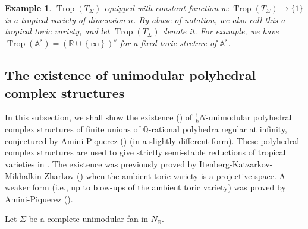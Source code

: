 \documentclass[12pt,a4]{amsart}
\newtheorem{exam}[thm]{Example}
\def\A{\mathbb{A}}
\def\R{\mathbb{R}}
\def\Q{\mathbb{Q}}
\def\Trop{\mathop{\mathrm{trop}}\nolimits}
\def\Trop{\mathop{\mathrm{Trop}}\nolimits}
\numberwithin{equation}{section}
\numberwithin{figure}{section}
\begin{document}
  
  \begin{exam}
  $\Trop (T_\Sigma)$ equipped with constant function $w \colon \Trop (T_\Sigma) \to \{ 1 \}$
  is a tropical variety of dimension $n$. 
  By abuse of notation, we also call this a \emph{tropical toric variety,}
  and let $\Trop(T_{\Sigma})$ denote it. 
  For example, we have $\Trop(\A^{s})=(\R\cup\left\{ \infty\right\} )^{s}$
  for a fixed toric strcture of $\A^{s}$. 
  \end{exam}




 \subsection{The existence of unimodular polyhedral complex structures}
  \label{subsec:the_existence_of_unimodular_triangulations}

  In this subsection, 
    we shall show the existence () of 
    $\frac{1}{k}N$-unimodular polyhedral complex structures of  
    finite unions of 
    $\Q$-rational polyhedra regular at infinity,
    conjectured by  Amini-Piquerez
    (\cite[Subsection 1.12]{AminiPiquerezHodgetheoryfortropicalvarieties2020}) 
    (in a slightly different form). 
  These polyhedral complex structures are used to give 
  strictly semi-stable reductions of tropical varieties 
  in .
   The existence was previously proved by Itenberg-Katzarkov-Mikhalkin-Zharkov 
    (\cite[Proposition 48]{ItenbergKatzarkovMikhalkinZharkovTropicalhomology2019})
    when the ambient toric variety is a projective space.
   A weaker form 
    (i.e., up to blow-ups of the ambient toric variety) was proved by Amini-Piquerez
    (\cite[Theorem 4.1]{AminiPiquerezHodgetheoryfortropicalvarieties2020}).

   Let $\Sigma$ be a complete unimodular fan in $N_\R$.
\end{document}
